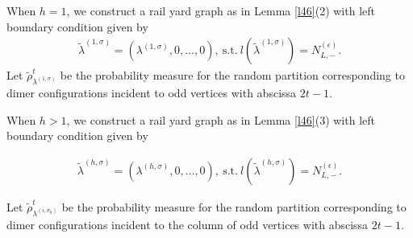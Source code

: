 \documentclass[11pt]{amsart}
\theoremstyle{plain}
\theoremstyle{definition}
\theoremstyle{remark}
\newcommand\si{\sigma}
\numberwithin{equation}{section}
\numberwithin{theorem}{section}
\numberwithin{figure}{section}
\begin{document}
When $h=1$, we construct a rail yard graph as in Lemma \ref{l46}(2) with left boundary condition given by
\begin{align*}
\tilde{\lambda}^{(1,\si)}=(\lambda^{(1,\si)},0,\ldots,0),\ \mathrm{s.t.}\ l(\tilde{\lambda}^{(1,\si)})=N_{L,-}^{(\epsilon)}.
\end{align*}
Let $\tilde{\rho}^{t}_{\lambda^{(1,\si)}}$ be the probability measure for the random partition corresponding to dimer configurations incident to odd vertices with abscissa $2t-1$.

When $h>1$, we construct a rail yard graph as in Lemma \ref{l46}(3) with left boundary condition given by 
\begin{small}
\begin{align}
\tilde{\lambda}^{(h,\si)}=(\lambda^{(h,\si)},0,\ldots,0),\ \mathrm{s.t.}\ l(\tilde{\lambda}^{(h,\si)})=N_{L,-}^{(\epsilon
)}.\label{dlh}
\end{align}
\end{small}
Let $\tilde{\rho}^{t}_{\lambda^{(i,\si_0)}}$  
be the probability measure for the random partition  corresponding to dimer configurations incident to the  column of odd vertices with abscissa $2t-1$.
\end{document}
